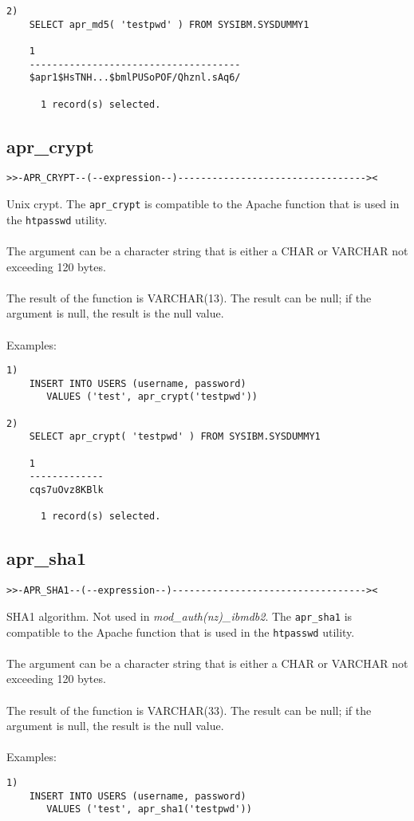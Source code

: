 \documentclass[11pt,a4paper]{article}
\begin{document}
\begin{appendix}
\begin{verbatim}
2)
    SELECT apr_md5( 'testpwd' ) FROM SYSIBM.SYSDUMMY1

    1
    -------------------------------------
    $apr1$HsTNH...$bmlPUSoPOF/Qhznl.sAq6/

      1 record(s) selected.
\end{verbatim}
\newpage
\hypertarget{haprcrypt}{}
\subsection{apr\_crypt} \label{aprcrypt}
\begin{verbatim}
>>-APR_CRYPT--(--expression--)---------------------------------><
\end{verbatim}
Unix crypt. The {\tt apr\_crypt} is compatible to the Apache function that is used in the {\tt htpasswd} utility.\\
\\
The argument can be a character string that is either a \mbox{CHAR} or \mbox{VARCHAR} not exceeding 120 bytes.\\
\\
The result of the function is VARCHAR(13). The result can be null; if the argument is null, the result is the null value.\\
\\
Examples:
\begin{verbatim}
1)
    INSERT INTO USERS (username, password)
       VALUES ('test', apr_crypt('testpwd'))

2)
    SELECT apr_crypt( 'testpwd' ) FROM SYSIBM.SYSDUMMY1

    1
    -------------
    cqs7uOvz8KBlk

      1 record(s) selected.
\end{verbatim}
\newpage
\hypertarget{haprsha1}{}
\subsection{apr\_sha1} \label{aprsha1}
\begin{verbatim}
>>-APR_SHA1--(--expression--)----------------------------------><
\end{verbatim}
SHA1 algorithm. Not used in \emph{mod\_auth(nz)\_ibmdb2}. The {\tt apr\_sha1} is compatible to the Apache function that is used in the {\tt htpasswd} utility.\\
\\
The argument can be a character string that is either a \mbox{CHAR} or \mbox{VARCHAR} not exceeding 120 bytes.\\
\\
The result of the function is VARCHAR(33). The result can be null; if the argument is null, the result is the null value.\\
\\
Examples:
\begin{verbatim}
1)
    INSERT INTO USERS (username, password)
       VALUES ('test', apr_sha1('testpwd'))


\end{verbatim}
\end{appendix}
\end{document}
